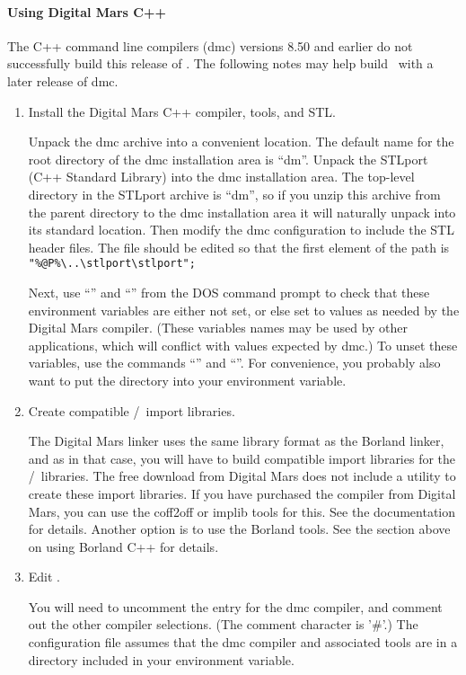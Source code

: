 \paragraph{Using Digital Mars C++}

The  C++ 
command line compilers (dmc) versions 8.50 and earlier do not
successfully build this release of \OOMMF.  The following notes may help
build \OOMMF\ with a later release of dmc.
\begin{enumerate}
\item Install the Digital Mars C++ compiler, tools, and STL.

  Unpack the dmc archive into a convenient location.  The default name
  for the root directory of the dmc installation area is ``dm''.  Unpack
  the STLport (C++ Standard Library) into the dmc installation area.
  The top-level directory in the STLport archive is ``dm'', so if you
  unzip this archive from the parent directory to the dmc installation
  area it will naturally unpack into its standard location.  Then modify
  the dmc configuration to include the STL header files.  The
   file should be edited so that the first
  element of the  path is \verb+"%@P%\..\stlport\stlport";+

  Next, use ``'' and ``'' from the DOS
  command prompt to check that these environment variables are either
  not set, or else set to values as needed by the Digital Mars compiler.
  (These variables names may be used by other applications, which will
  conflict with values expected by dmc.)  To unset these variables, use
  the commands ``'' and ``''.  For
  convenience, you probably also want to put the 
  directory into your environment  variable.

\item Create compatible \Tcl/\Tk\ import libraries.

  The Digital Mars linker uses the same library format as the Borland
  linker, and as in that case, you will have to build compatible import
  libraries for the \Tcl/\Tk\ libraries.  The free download from Digital
  Mars does not include a utility to create these import libraries.  If
  you have purchased the compiler from Digital Mars, you can use the
  coff2off or implib tools for this.  See the documentation for details.
  Another option is to use the Borland tools.  See the section above on
  using Borland C++ for details.

\item Edit .

  You will need to uncomment the entry for the dmc compiler, and comment
  out the other compiler selections.  (The comment character is '\#'.)
  The configuration file assumes that the dmc compiler and associated
  tools are in a directory included in your environment 
  variable.

\end{enumerate}
